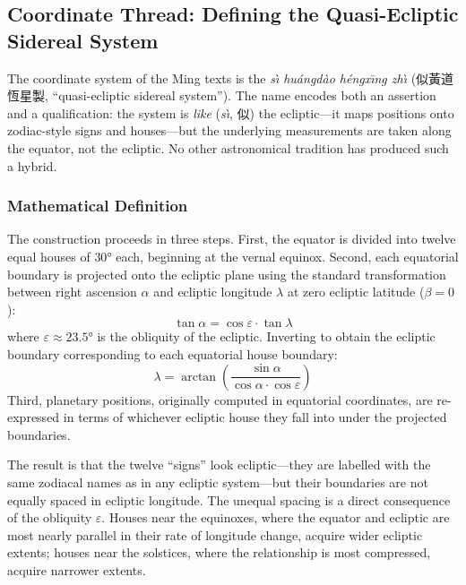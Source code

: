 \documentclass[10pt,a4paper]{article}
\newcommand{\zh}[1]{#1}
\providecommand{\degree}{\ensuremath{°}}
\begin{document}
\subsection*{Coordinate Thread: Defining the Quasi-Ecliptic Sidereal System}

The coordinate system of the Ming texts is the
\textit{s\`{\i} hu\'angd\`ao h\'engx\={\i}ng
zh\`{\i}} (\zh{似黃道恆星製}, ``quasi-ecliptic sidereal system'').  The name encodes
both an assertion and a qualification: the system is \textit{like}
(\textit{s\`{\i}}, \zh{似}) the ecliptic---it maps positions onto zodiac-style signs
and houses---but the underlying measurements are taken along the
equator, not the ecliptic.  No other astronomical tradition has
produced such a hybrid.

\subsubsection*{Mathematical Definition}

The construction proceeds in three steps.  First, the equator is
divided into twelve equal houses of $30\degree$ each, beginning at
the vernal equinox.  Second, each equatorial boundary is projected
onto the ecliptic plane using the standard transformation between
right ascension $\alpha$ and ecliptic longitude $\lambda$ at zero
ecliptic latitude ($\beta = 0$):
\begin{equation}
  \tan\alpha = \cos\varepsilon \cdot \tan\lambda
  \label{eq:ra-to-ecl}
\end{equation}
where $\varepsilon \approx 23.5\degree$ is the obliquity of the
ecliptic.  Inverting to obtain the ecliptic boundary corresponding to
each equatorial house boundary:
\begin{equation}
  \lambda = \arctan\!\left(\frac{\sin\alpha}{\cos\alpha \cdot \cos\varepsilon}\right)
  \label{eq:ecl-boundary}
\end{equation}
Third, planetary positions, originally computed in equatorial
coordinates, are re-expressed in terms of whichever ecliptic house
they fall into under the projected boundaries.

The result is that the twelve ``signs'' look ecliptic---they are
labelled with the same zodiacal names as in any ecliptic
system---but their boundaries are not equally spaced in ecliptic
longitude.  The unequal spacing is a direct consequence of the
obliquity $\varepsilon$.  Houses near the equinoxes, where the
equator and ecliptic are most nearly parallel in their rate of
longitude change, acquire wider ecliptic extents; houses near the
solstices, where the relationship is most compressed, acquire
narrower extents.
\end{document}
